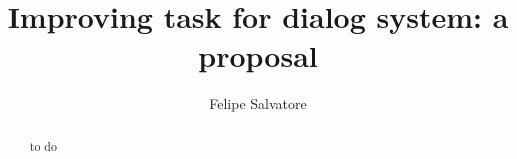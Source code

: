\documentclass[12pt]{report}
\title{Improving task for dialog system: a proposal}
\author{Felipe Salvatore}
\begin{document}
\maketitle

\begin{abstract}
to do
\end{abstract}
\tableofcontents






\end{document}
